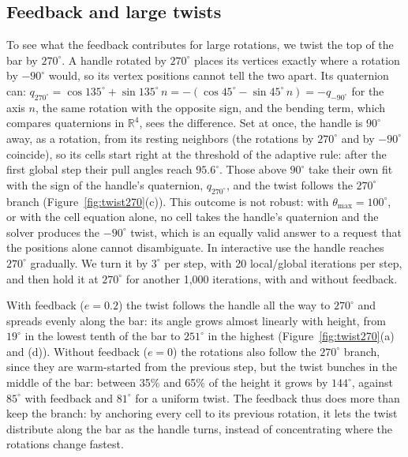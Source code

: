 \documentclass{birkjour}
\theoremstyle{remark}
\numberwithin{equation}{section}
\begin{document}
\subsection{Feedback and large twists}
\label{section:results_twist}

To see what the feedback contributes for large rotations, we twist the top of the bar by $270^\circ$. A handle rotated by $270^\circ$ places its vertices exactly where a rotation by $-90^\circ$ would, so its vertex positions cannot tell the two apart. Its quaternion can: $q_{270^\circ} = \cos 135^\circ + \sin 135^\circ \, n = -(\cos 45^\circ - \sin 45^\circ \, n) = -q_{-90^\circ}$ for the axis $n$, the same rotation with the opposite sign, and the bending term, which compares quaternions in $\mathbb R^4$, sees the difference. Set at once, the handle is $90^\circ$ away, as a rotation, from its resting neighbors (the rotations by $270^\circ$ and by $-90^\circ$ coincide), so its cells start right at the threshold of the adaptive rule: after the first global step their pull angles reach $95.6^\circ$. Those above $90^\circ$ take their own fit with the sign of the handle's quaternion, $q_{270^\circ}$, and the twist follows the $270^\circ$ branch (Figure~\ref{fig:twist270}(c)). This outcome is not robust: with $\theta_{\max} = 100^\circ$, or with the cell equation alone, no cell takes the handle's quaternion and the solver produces the $-90^\circ$ twist, which is an equally valid answer to a request that the positions alone cannot disambiguate. In interactive use the handle reaches $270^\circ$ gradually. We turn it by $3^\circ$ per step, with 20 local/global iterations per step, and then hold it at $270^\circ$ for another 1{,}000 iterations, with and without feedback.

With feedback ($e = 0.2$) the twist follows the handle all the way to $270^\circ$ and spreads evenly along the bar: its angle grows almost linearly with height, from $19^\circ$ in the lowest tenth of the bar to $251^\circ$ in the highest (Figure~\ref{fig:twist270}(a) and (d)). Without feedback ($e = 0$) the rotations also follow the $270^\circ$ branch, since they are warm-started from the previous step, but the twist bunches in the middle of the bar: between 35\% and 65\% of the height it grows by $144^\circ$, against $85^\circ$ with feedback and $81^\circ$ for a uniform twist. The feedback thus does more than keep the branch: by anchoring every cell to its previous rotation, it lets the twist distribute along the bar as the handle turns, instead of concentrating where the rotations change fastest.
\end{document}
